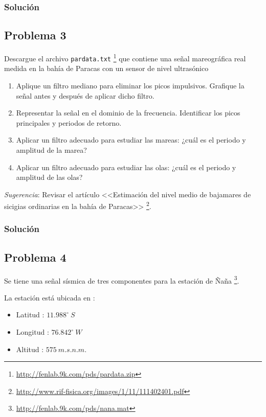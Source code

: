 \documentclass[a4paper,12pt,final]{article}
\begin{document}
    \subsubsection*{Solución}

  \newpage
  \subsection*{Problema 3}
    \noindent Descargue el archivo \texttt{pardata.txt}
      \footnote{\url{http://fenlab.9k.com/pds/pardata.zip}} que contiene una
      señal mareográfica real medida en la bahía de Paracas con un sensor
      de nivel ultrasónico

      \begin{enumerate}[label=\alph*)]
        \item Aplique un filtro mediano para eliminar los picos impulsivos. Grafique la señal antes y después de aplicar dicho filtro.
        \item Representar la señal en el dominio de la frecuencia. Identificar los picos principales y periodos de retorno.
        \item Aplicar un filtro adecuado para estudiar las mareas: ¿cuál es el periodo y amplitud de la marea?
        \item Aplicar un filtro adecuado para estudiar las olas: ¿cuál es el periodo y amplitud de las olas?
      \end{enumerate}

      \noindent \emph{Sugerencia}: Revisar el artículo <<Estimación del nivel medio de bajamares de sicigias ordinarias en la bahía de Paracas>>
      \footnote{\url{http://www.rif-fisica.org/images/1/11/111402401.pdf}}.

    \subsubsection*{Solución}

  \newpage
  \subsection*{Problema 4}
    \noindent Se tiene una señal sísmica de tres componentes para la estación de
      Ñaña \footnote{\url{http://fenlab.9k.com/pds/nana.mat}}.

      \noindent La estación está ubicada en :

      \begin{itemize}
        \item Latitud  : $11.988^\circ\ S$
        \item Longitud : $76.842^\circ\ W$
        \item Altitud  : $575\ m.s.n.m$.
      \end{itemize}
\end{document}

